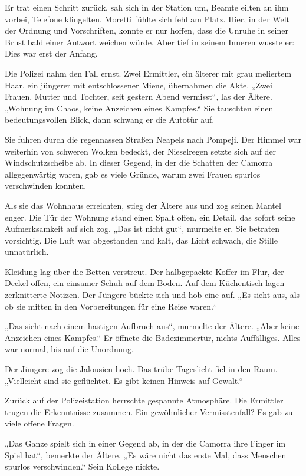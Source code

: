 \documentclass[
]{article}
\begin{document}
Er trat einen Schritt zurück, sah sich in der Station um, Beamte eilten an ihm vorbei, Telefone klingelten. Moretti fühlte sich fehl am Platz. Hier, in der Welt der Ordnung und Vorschriften, konnte er nur hoffen, dass die Unruhe in seiner Brust bald einer Antwort weichen würde. Aber tief in seinem Inneren wusste er: Dies war erst der Anfang.

Die Polizei nahm den Fall ernst. Zwei Ermittler, ein älterer mit grau meliertem Haar, ein jüngerer mit entschlossener Miene, übernahmen die Akte. „Zwei Frauen, Mutter und Tochter, seit gestern Abend vermisst``, las der Ältere. „Wohnung im Chaos, keine Anzeichen eines Kampfes.`` Sie tauschten einen bedeutungsvollen Blick, dann schwang er die Autotür auf.

Sie fuhren durch die regennassen Straßen Neapels nach Pompeji. Der Himmel war weiterhin von schweren Wolken bedeckt, der Nieselregen setzte sich auf der Windschutzscheibe ab. In dieser Gegend, in der die Schatten der Camorra allgegenwärtig waren, gab es viele Gründe, warum zwei Frauen spurlos verschwinden konnten.

Als sie das Wohnhaus erreichten, stieg der Ältere aus und zog seinen Mantel enger. Die Tür der Wohnung stand einen Spalt offen, ein Detail, das sofort seine Aufmerksamkeit auf sich zog. „Das ist nicht gut``, murmelte er. Sie betraten vorsichtig. Die Luft war abgestanden und kalt, das Licht schwach, die Stille unnatürlich.

Kleidung lag über die Betten verstreut. Der halbgepackte Koffer im Flur, der Deckel offen, ein einsamer Schuh auf dem Boden. Auf dem Küchentisch lagen zerknitterte Notizen. Der Jüngere bückte sich und hob eine auf. „Es sieht aus, als ob sie mitten in den Vorbereitungen für eine Reise waren.``

„Das sieht nach einem hastigen Aufbruch aus``, murmelte der Ältere. „Aber keine Anzeichen eines Kampfes.`` Er öffnete die Badezimmertür, nichts Auffälliges. Alles war normal, bis auf die Unordnung.

Der Jüngere zog die Jalousien hoch. Das trübe Tageslicht fiel in den Raum. „Vielleicht sind sie geflüchtet. Es gibt keinen Hinweis auf Gewalt.``

Zurück auf der Polizeistation herrschte gespannte Atmosphäre. Die Ermittler trugen die Erkenntnisse zusammen. Ein gewöhnlicher Vermisstenfall? Es gab zu viele offene Fragen.

„Das Ganze spielt sich in einer Gegend ab, in der die Camorra ihre Finger im Spiel hat``, bemerkte der Ältere. „Es wäre nicht das erste Mal, dass Menschen spurlos verschwinden.`` Sein Kollege nickte.
\end{document}
